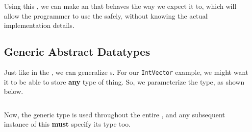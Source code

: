 Using this , we can make an  that behaves the way we expect it to, which will allow the programmer to use the  safely, without knowing the actual implementation details.

\subsection{Generic Abstract Datatypes}\label{subsec:Generic_Abstract_Datatypes}
Just like in the , we can generalize s.
For our \texttt{IntVector} example, we might want it to be able to store \textbf{any} type of thing.
So, we parameterize the  type, as shown below.
\inputminted[frame=lines,linenos]{rust}{./EDAP05-Concepts_Programming_Languages-Sections/Abstract_Data_Types/Code/Generic_Vector.rs}

Now, the generic type  is used throughout the entire , and any subsequent instance of this  \textbf{must} specify its type too.






